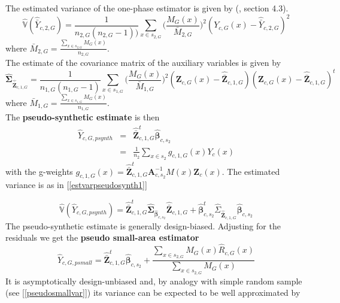 \documentclass[a4paper,12pt,leqno, titlepage]{article}
\newcommand{\VAR}{\mathbb{V}}
\begin{document}
The estimated variance of the one-phase estimator is given by (\cite{mandallaz}, section 4.3).
\begin{equation}\label{onephaseclustervariance}
\hat{\VAR}(\hat{\bar{Y}}_{c,2,G})=\frac{1}{n_{2,G}(n_{2,G}-1))}
\sum_{x\in{s_{2,G}}}\big(\frac{M_G(x)}{\bar{M}_{2,G}}\big)^2(Y_{c,G}(x)-\hat{\bar{Y}}_{c,2,G})^2
\end{equation}
\noindent where $\bar{M}_{2,G}=\frac{\sum_{x\in{s_{2,G}}}M_G(x)}{n_{2,G}}$.\\
The estimate of the covariance matrix of the auxiliary variables is given by
\begin{equation}\label{estcovauxiliarycluster}
\hat{\pmb{\Sigma}}_{\hat{\bar{\pmb{Z}}}_{c,1,G}}=\frac{1}{n_{1,G}(n_{1,G}-1)}
\sum_{x\in{s_{1,G}}}\big(\frac{M_G(x)}{\bar{M}_{1,G}}\big)^2(\pmb{Z}_{c,G}(x)-\hat{\bar{\pmb{Z}}}_{c,1,G})
(\pmb{Z}_{c,G}(x)-\hat{\bar{\pmb{Z}}}_{c,1,G})^t
\end{equation}
\noindent where $\bar{M}_{1,G}=\frac{\sum_{x\in{s_{1,G}}}M_G(x)}{n_{1,G}}$.\\
The \textbf{pseudo-synthetic estimate} is then
\begin{eqnarray}\label{psynthclusterest}
\hat{Y}_{c,G,psynth}&=&\hat{\bar{\pmb{Z}}}_{c,1,G}^t\hat{\pmb{\beta}}_{c,s_2}\nonumber \\
&=& \frac{1}{n_2}\sum_{x\in{s_2}}g_{c,1,G}(x)Y_c(x)
\end{eqnarray}
with the g-weights $g_{c,1,G}(x)=\hat{\bar{\pmb{Z}}}_{c,1,G}^t\pmb{A}^{-1}_{c,s_2}M(x)\pmb{Z}_c(x)$. The estimated variance is as in [\ref{estvarpseudosynth1}]

\begin{equation}\label{estvarpseudosynth1cluster}
\hat{\VAR}(\hat{Y}_{c,G,psynth})=
\hat{\bar{\pmb{Z}}}_{c,1,G}^t\hat{\pmb{\Sigma}}_{\hat{\pmb{\beta}}_{c,s_2}}\hat{\bar{\pmb{Z}}}_{c,1,G}
+ \hat{\pmb{\beta}}_{c,s_2}^t\hat{\Sigma}_{\hat{\bar{\pmb{Z}}}_{c,1,G}}\hat{\pmb{\beta}}_{c,s_2}
\end{equation}
The pseudo-synthetic estimate is generally design-biased. Adjusting for the residuals we get the  \textbf{pseudo small-area estimator}
\begin{equation}\label{psmallclusterest}
\hat{Y}_{c,G,psmall}=\hat{\bar{\pmb{Z}}}_{c,1,G}^t\hat{\pmb{\beta}}_{c,s_2}
+ \frac{\sum_{x\in{s_{2,G}}}M_G(x)\hat{R}_{c,G}(x)}{\sum_{x\in{s_{2,G}}}M_G(x)}
\end{equation}
It is asymptotically design-unbiased and, by analogy with simple random sample (see [\ref{pseudosmallvar}]) its variance can be expected to be well approximated by
\end{document}

